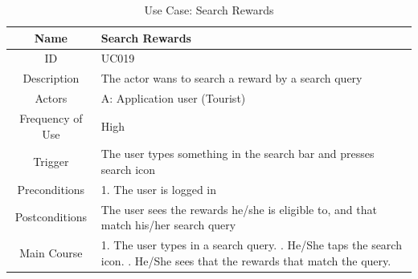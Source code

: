 \documentclass[12pt, a4paper, oneside]{article}
\begin{document}
\begin{table}[H]
\begin{tabularx}{\linewidth}{|c|X|}
\hline
Name                & Search Rewards                                                                                                                                                                                                                     \\ \hline
ID                  & UC019                                                                                                                                                                                                                       \\ \hline
Description         & The actor wans to search a reward by a search query                                                                                                                                                   \\ \hline
Actors              & A: Application user (Tourist)                                                                                                                                                                                                 \\ \hline
Frequency of Use    & High                                                                                                                                                                                                                    \\ \hline
Trigger             & The user types something in the search bar and presses search icon                                                                                                                                                                                           \\ \hline
Preconditions       & 1. The user is logged in                                                                                                                                                                                                                         \\ \hline
Postconditions      & The user sees the rewards he/she is eligible to, and that match his/her search query                                                                                                                                      \\ \hline
Main Course         & 1. The user types in a search query. \newline 2. He/She taps the search icon. \newline 3. He/She sees that the rewards that match the query. \\ \hline
\end{tabularx}
\caption{Use Case: Search Rewards}
\label{uc-search-rewards}
\end{table}
\end{document}
